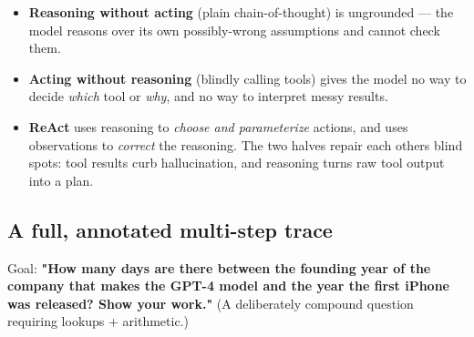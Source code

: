 \documentclass[11pt]{article}
\providecommand{\tightlist}{\setlength{\itemsep}{1pt}\setlength{\parskip}{0pt}}
\begin{document}
\begin{itemize}
\tightlist
\item
  \textbf{Reasoning without acting} (plain chain-of-thought) is ungrounded --- the model reasons over its own possibly-wrong assumptions and cannot check them.
\item
  \textbf{Acting without reasoning} (blindly calling tools) gives the model no way to decide \emph{which} tool or \emph{why}, and no way to interpret messy results.
\item
  \textbf{ReAct} uses reasoning to \emph{choose and parameterize} actions, and uses observations to \emph{correct} the reasoning. The two halves repair each other\textquotesingle s blind spots: tool results curb hallucination, and reasoning turns raw tool output into a plan.
\end{itemize}

\subsection{A full, annotated multi-step trace}\label{a-full-annotated-multi-step-trace}

Goal: \textbf{"How many days are there between the founding year of the company that makes the GPT-4 model and the year the first iPhone was released? Show your work."} (A deliberately compound question requiring lookups + arithmetic.)

\setcodelang{}
\end{document}
